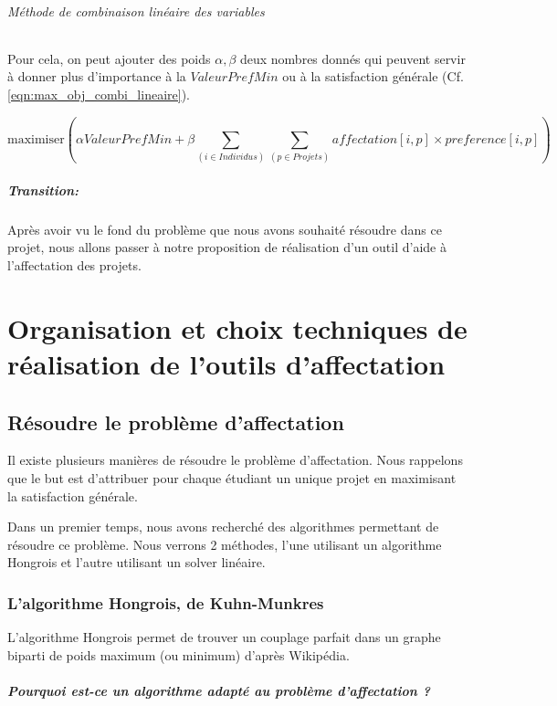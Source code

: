 \documentclass[final,poster]{polytech/polytech}
\begin{document}
\subparagraph{Méthode de combinaison linéaire des variables}
Pour cela, on peut ajouter des poids $\alpha, \beta$ deux nombres donnés qui peuvent servir à donner plus d'importance à la $ValeurPrefMin$ ou à la satisfaction générale (Cf. \eqref{eqn:max_obj_combi_lineaire}).

\begin{equation}
\label{eqn:max_obj_combi_lineaire}
\text{maximiser} \left( \alpha ValeurPrefMin + \beta \sum_{(i \in Individus)} \sum_{(p\in Projets)} affectation[i,p]\times preference[i,p] \right)
\end{equation}


\paragraph{Transition:}
Après avoir vu le fond du problème que nous avons souhaité résoudre dans ce projet, nous allons passer à notre proposition de réalisation d'un outil d'aide à l'affectation des projets.


\chapter{Organisation et choix techniques de réalisation de l'outils d'affectation}



\section{Résoudre le problème d'affectation}
Il existe plusieurs manières de résoudre le problème d'affectation.
Nous rappelons que le but est d'attribuer pour chaque étudiant un unique projet en maximisant la satisfaction générale.

Dans un premier temps, nous avons recherché des algorithmes permettant de résoudre ce problème. Nous verrons 2 méthodes, l'une utilisant un algorithme Hongrois et l'autre utilisant un solver linéaire.

\subsection{L'algorithme Hongrois, de Kuhn-Munkres}

L'algorithme Hongrois permet de trouver un couplage parfait dans un graphe biparti de poids maximum (ou minimum) d'après Wikipédia.

\paragraph{Pourquoi est-ce un algorithme adapté au problème d'affectation ?}
\end{document}
